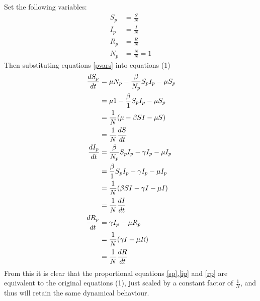 Set the following variables:
\begin{subequations}\label{pvars}
\begin{align}
    S_p &= \frac{S}{N}\\
    I_p &= \frac{I}{N}\\
    R_p &= \frac{R}{N}\\
    N_p &= \frac{N}{N} = 1
\end{align}
\end{subequations}
Then substituting equations \ref{pvars} into equations (1)
\begin{align}
  \frac{dS_p}{dt} &= \mu N_p -\frac{\beta}{N_p} S_p I_p - \mu S_p\nonumber\\
                  &= \mu 1 -\frac{\beta}{1} S_p I_p - \mu S_p\nonumber\\
                  &= \frac{1}{N}(\mu -\beta SI - \mu S)\nonumber\\
                  &= \frac{1}{N} \frac{dS}{dt}\label{sp}\\
  \vspace{8pt}
  \frac{dI_p}{dt} &= \frac{\beta}{N_p} S_p I_p - \gamma I_p - \mu I_p\nonumber\\
                  &= \frac{\beta}{1} S_p I_p - \gamma I_p - \mu I_p\nonumber\\
                  &= \frac{1}{N} (\beta SI - \gamma I - \mu I)\nonumber\\
                  &= \frac{1}{N} \frac{dI}{dt}\label{ip}\\
  \vspace{8pt}
  \frac{dR_p}{dt} &= \gamma I_p - \mu R_p\nonumber\\
                  &= \frac{1}{N} (\gamma I - \mu R)\nonumber\\
                  &= \frac{1}{N} \frac{dR}{dt}\label{rp}
\end{align}
From this it is clear that the proportional equations \ref{sp},\ref{ip} and \ref{rp} are equivalent to the original equations (1), just scaled by a constant factor of $\frac{1}{N}$, and thus will retain the same dynamical behaviour.
